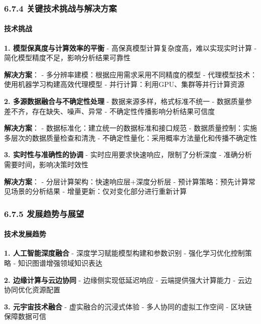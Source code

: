 \subsubsection{6.7.4 关键技术挑战与解决方案}\label{ux5173ux952eux6280ux672fux6311ux6218ux4e0eux89e3ux51b3ux65b9ux6848}

\paragraph{技术挑战}\label{ux6280ux672fux6311ux6218}

\textbf{1. 模型保真度与计算效率的平衡} - 高保真模型计算复杂度高，难以实现实时计算 - 简化模型精度不足，影响分析结果可靠性

\textbf{解决方案}： - 多分辨率建模：根据应用需求采用不同精度的模型 - 代理模型技术：使用机器学习构建高效代理模型 - 并行计算：利用GPU、集群等并行计算资源

\textbf{2. 多源数据融合与不确定性处理} - 数据来源多样，格式标准不统一 - 数据质量参差不齐，存在缺失、噪声、异常 - 不确定性传播影响分析结果可信度

\textbf{解决方案}： - 数据标准化：建立统一的数据标准和接口规范 - 数据质量控制：实施多层次的数据质量检查和清洗 - 不确定性量化：采用概率方法量化和传播不确定性

\textbf{3. 实时性与准确性的协调} - 实时应用要求快速响应，限制了分析深度 - 准确分析需要时间，影响决策时效性

\textbf{解决方案}： - 分层计算架构：快速响应层+深度分析层 - 预计算策略：预先计算常见场景的分析结果 - 增量更新：仅对变化部分进行重新计算

\subsubsection{6.7.5 发展趋势与展望}\label{ux53d1ux5c55ux8d8bux52bfux4e0eux5c55ux671b}

\paragraph{技术发展趋势}\label{ux6280ux672fux53d1ux5c55ux8d8bux52bf}

\textbf{1. 人工智能深度融合} - 深度学习赋能模型构建和参数识别 - 强化学习优化控制策略 - 知识图谱增强领域知识表达

\textbf{2. 边缘计算与云边协同} - 边缘侧实现低延迟响应 - 云端提供强大计算能力 - 云边协同优化资源配置

\textbf{3. 元宇宙技术融合} - 虚实融合的沉浸式体验 - 多人协同的虚拟工作空间 - 区块链保障数据可信

